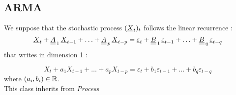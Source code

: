 \newpage
\subsection{ARMA}


We suppose that the stochastic process $({\underline{X}}_t)_t$ follows the linear recurrence :
\begin{equation}\label{dimnUM}
{\underline{X}}_t + {\underline{\underline{A}}}_{\, 1}   \,  {\underline{X}}_{t-1} + \hdots +  {\underline{\underline{A}}}_{\, p} \,   {\underline{X}}_{t-p} =
{\underline{\varepsilon}}_{t}+  {\underline{\underline{B}}}_ {\, 1} \,   {\underline{\varepsilon}}_{t-1}+   \hdots + {\underline{\underline{B}}}_{\, q}  \,  {\underline{\varepsilon}}_{t-q}
\end{equation}
that writes in dimension 1 :

\begin{equation}\label{dim1UM}
X_t +a_1  X_{t-1} + \hdots +  a_p X_{t-p} =
\varepsilon_{t}+  b_1 \varepsilon_{t-1}+   \hdots +b_q \varepsilon_{t-q}
\end{equation}
where $(a_i,b_i) \in {\mathbb R}$.\\

This class inherits from \textit{Process}

\newpage
